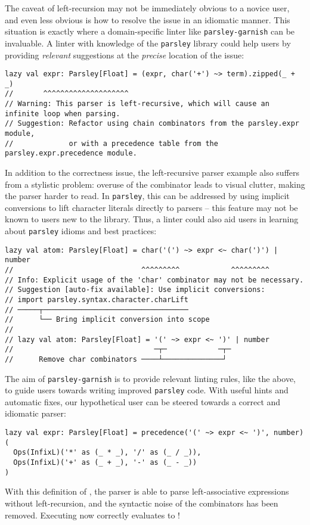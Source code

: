 \documentclass[../../main.tex]{subfiles}
\begin{document}
The caveat of left-recursion may not be immediately obvious to a novice user, and even less obvious is how to resolve the issue in an idiomatic manner.
This situation is exactly where a domain-specific linter like \texttt{parsley-garnish} can be invaluable.
A linter with knowledge of the \texttt{parsley} library could help users by providing \emph{relevant} suggestions at the \emph{precise} location of the issue:
\begin{verbatim}
lazy val expr: Parsley[Float] = (expr, char('+') ~> term).zipped(_ + _)
//       ^^^^^^^^^^^^^^^^^^^^
// Warning: This parser is left-recursive, which will cause an infinite loop when parsing.
// Suggestion: Refactor using chain combinators from the parsley.expr module,
//             or with a precedence table from the parsley.expr.precedence module.
\end{verbatim}
%
In addition to the correctness issue, the left-recursive parser example also suffers from a stylistic problem:
overuse of the \scala{char} combinator leads to visual clutter, making the parser harder to read.
In \texttt{parsley}, this can be addressed by using implicit conversions to lift character literals directly to parsers -- this feature may not be known to users new to the library.
Thus, a linter could also aid users in learning about \texttt{parsley} idioms and best practices:
\begin{verbatim}
lazy val atom: Parsley[Float] = char('(') ~> expr <~ char(')') | number
//                              ^^^^^^^^^            ^^^^^^^^^
// Info: Explicit usage of the 'char' combinator may not be necessary.
// Suggestion [auto-fix available]: Use implicit conversions:
// import parsley.syntax.character.charLift
// ─────┬──────────────────────────────────
//      └── Bring implicit conversion into scope
//
// lazy val atom: Parsley[Float] = '(' ~> expr <~ ')' | number
//                                 ─┬─            ─┬─
//      Remove char combinators ────┴──────────────┘
\end{verbatim}
%
The aim of \texttt{parsley-garnish} is to provide relevant linting rules, like the above, to guide users towards writing improved \texttt{parsley} code.
With useful hints and automatic fixes, our hypothetical user can be steered towards a correct and idiomatic parser:
\begin{verbatim}
lazy val expr: Parsley[Float] = precedence('(' ~> expr <~ ')', number)(
  Ops(InfixL)('*' as (_ * _), '/' as (_ / _)),
  Ops(InfixL)('+' as (_ + _), '-' as (_ - _))
)
\end{verbatim}
%
With this definition of , the parser is able to parse left-associative expressions without left-recursion, and the syntactic noise of the  combinators has been removed.
Executing \scala{expr.parse("1+2*3/4")} now correctly evaluates to \scala{2.5}!
\end{document}
